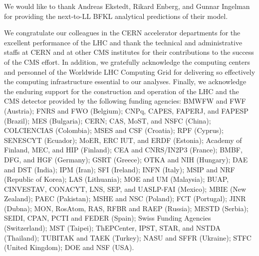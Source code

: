 \documentclass[11pt,twoside,a4paper,cmspaper,final,collab]{cms-tdr}
\begin{document}
\begin{acknowledgments} We would like to thank Andreas Ekstedt, Rikard Enberg, and Gunnar Ingelman for providing the next-to-LL BFKL analytical predictions of their model.

We congratulate our colleagues in the CERN accelerator departments for the excellent performance of the LHC and thank the technical and administrative staffs at CERN and at other CMS institutes for their contributions to the success of the CMS effort. In addition, we gratefully acknowledge the computing centers and personnel of the Worldwide LHC Computing Grid for delivering so effectively the computing infrastructure essential to our analyses. Finally, we acknowledge the enduring support for the construction and operation of the LHC and the CMS detector provided by the following funding agencies: BMWFW and FWF (Austria); FNRS and FWO (Belgium); CNPq, CAPES, FAPERJ, and FAPESP (Brazil); MES (Bulgaria); CERN; CAS, MoST, and NSFC (China); COLCIENCIAS (Colombia); MSES and CSF (Croatia); RPF (Cyprus); SENESCYT (Ecuador); MoER, ERC IUT, and ERDF (Estonia); Academy of Finland, MEC, and HIP (Finland); CEA and CNRS/IN2P3 (France); BMBF, DFG, and HGF (Germany); GSRT (Greece); OTKA and NIH (Hungary); DAE and DST (India); IPM (Iran); SFI (Ireland); INFN (Italy); MSIP and NRF (Republic of Korea); LAS (Lithuania); MOE and UM (Malaysia); BUAP, CINVESTAV, CONACYT, LNS, SEP, and UASLP-FAI (Mexico); MBIE (New Zealand); PAEC (Pakistan); MSHE and NSC (Poland); FCT (Portugal); JINR (Dubna); MON, RosAtom, RAS, RFBR and RAEP (Russia); MESTD (Serbia); SEIDI, CPAN, PCTI and FEDER (Spain); Swiss Funding Agencies (Switzerland); MST (Taipei); ThEPCenter, IPST, STAR, and NSTDA (Thailand); TUBITAK and TAEK (Turkey); NASU and SFFR (Ukraine); STFC (United Kingdom); DOE and NSF (USA).


\end{acknowledgments}
\end{document}
